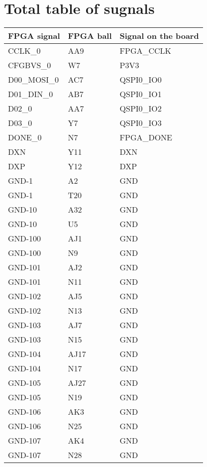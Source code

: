 \section{Total table of sugnals}

\begin{footnotesize}
	\begin{longtable}{|p{7cm}|p{1cm}|p{5cm}|}
		\hline
FPGA signal	&	FPGA ball	&	Signal on the board	\\ \hline
CCLK\_0	&	AA9	&	FPGA\_CCLK	\\ \hline
CFGBVS\_0	&	W7	&	P3V3	\\ \hline
D00\_MOSI\_0	&	AC7	&	QSPI0\_IO0	\\ \hline
D01\_DIN\_0	&	AB7	&	QSPI0\_IO1	\\ \hline
D02\_0	&	AA7	&	QSPI0\_IO2	\\ \hline
D03\_0	&	Y7	&	QSPI0\_IO3	\\ \hline
DONE\_0	&	N7	&	FPGA\_DONE	\\ \hline
DXN	&	Y11	&	DXN	\\ \hline
DXP	&	Y12	&	DXP	\\ \hline
GND-1	&	A2	&	GND	\\ \hline
GND-1	&	T20	&	GND	\\ \hline
GND-10	&	A32	&	GND	\\ \hline
GND-10	&	U5	&	GND	\\ \hline
GND-100	&	AJ1	&	GND	\\ \hline
GND-100	&	N9	&	GND	\\ \hline
GND-101	&	AJ2	&	GND	\\ \hline
GND-101	&	N11	&	GND	\\ \hline
GND-102	&	AJ5	&	GND	\\ \hline
GND-102	&	N13	&	GND	\\ \hline
GND-103	&	AJ7	&	GND	\\ \hline
GND-103	&	N15	&	GND	\\ \hline
GND-104	&	AJ17	&	GND	\\ \hline
GND-104	&	N17	&	GND	\\ \hline
GND-105	&	AJ27	&	GND	\\ \hline
GND-105	&	N19	&	GND	\\ \hline
GND-106	&	AK3	&	GND	\\ \hline
GND-106	&	N25	&	GND	\\ \hline
GND-107	&	AK4	&	GND	\\ \hline
GND-107	&	N28	&	GND	\\ \hline

\end{longtable}
\end{footnotesize}

